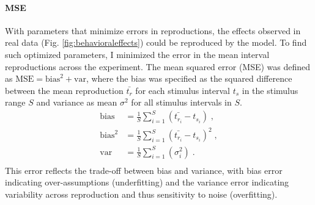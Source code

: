 \documentclass[10pt]{article}
\begin{document}
\paragraph{MSE}
With parameters that minimize errors in reproductions, the effects observed in real data (Fig. \ref{fig:behavioraleffects}) could be reproduced by the model.
To find such optimized parameters, I minimized the error in the mean interval reproductions across the experiment. The mean squared error (MSE) was defined as $\text{MSE} = \text{bias}^2+\text{var}$, where the bias was specified as the squared difference between the mean reproduction $\bar{t_{r}}$ for each stimulus interval $t_s$ in the stimulus range $S$ and variance as mean $\sigma^2$ for all stimulus intervals in $S$.
\begin{equation} \label{MSE}
	\begin{split}
	 \text{bias} & = \frac{1}{S} \sum \limits_{i=1}^{S} (\bar{t_{r_i}} - t_{s_i}) \;,\\
	 \text{bias}^2 & = \frac{1}{S} \sum \limits_{i=1}^{S}(\bar{t_{r_i}} - t_{s_i})^2 \;,\\
	 \text{var} & = \frac{1}{S} \sum \limits_{i=1}^{S}(\sigma_i^2) \;.\\
	\end{split}
\end{equation}
This error reflects the trade-off between bias and variance, with bias error indicating over-assumptions (underfitting) and the variance error indicating variability across reproduction and thus sensitivity to noise (overfitting).
\end{document}
